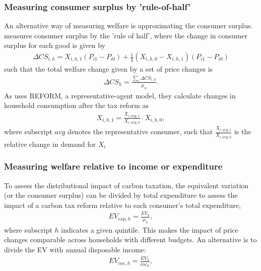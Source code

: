 \subsubsection{Measuring consumer surplus by 'rule-of-half'}
An alternative way of measuring welfare is approximating the consumer surplus. \cite{Kraka2020} measures consumer surplus by the 'rule of half', where the change in consumer surplus for each good is given by
\begin{align*}
    \Delta CS_{i,h} = X_{i,h,1}(P_{i1}-P_{i0}) +  \frac{1}{2}(X_{i,h,0} - X_{i,h,1})(P_{i1}-P_{i0})
\end{align*}
such that the total welfare change given by a set of price changes is
\begin{align}
    \Delta CS_h = \frac{\sum_i \Delta CS_{i,h}}{\mu_h}.
\end{align}
As \cite{Kraka2020} uses REFORM, a representative-agent model, they calculate changes in household consumption after the tax reform as 
\begin{align}
    X_{i,h,1} = \frac{X_{i,avg,1}}{X_{i,avg,0}} \cdot X_{i,h,0},
\end{align}
where subscript $avg$ denotes the representative consumer, such that $\frac{X_{i,avg,1}}{X_{i,avg,0}}$ is the relative change in demand for $X_i$

\subsubsection{Measuring welfare relative to income or expenditure}\label{sec:incomeorexpenditure}
To assess the distributional impact of carbon taxation, the equivalent variation (or the consumer surplus) can be divided by total expenditure to assess the impact of a carbon tax reform relative to each consumer's total expenditure, 
\begin{align}
    EV_{exp,h} = \frac{EV_h}{\mu_h},
\end{align}
where subscript $h$ indicates a given quintile. This makes the impact of price changes comparable across households with different budgets. An alternative is to divide the EV with annual disposable income:
\begin{align}
    EV_{inc,h} = \frac{EV_h}{inc_h},
\end{align}

